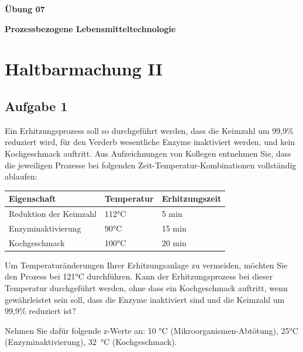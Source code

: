 \documentclass[a4paper,11pt]{article}
\begin{document}


\bckgrnd


\begin{center}
\LARGE
\color{white}
\textbf{Übung 07} \par \vspace*{2mm}
\large \color{miugray} \textbf{Prozessbezogene Lebensmitteltechnologie}
\end{center}
\par 
\vspace*{6mm}


\color{miudiutex}
\section*{Haltbarmachung II}

\subsection*{Aufgabe 1}
Ein Erhitzungsprozess soll so durchgeführt werden, dass die Keimzahl um 99,9\%
reduziert wird, für den Verderb wesentliche Enzyme inaktiviert werden, und kein
Kochgeschmack auftritt. Aus Aufzeichnungen von Kollegen entnehmen Sie, dass die
jeweiligen Prozesse bei folgenden Zeit-Temperatur-Kombinationen vollständig ablaufen:

\begin{center}
\begin{tabular}{|l|l|l|}
\rowcolor{miugray}
Eigenschaft& Temperatur & Erhitzungszeit \\ \hline
Reduktion der Keimzahl & 112°C & 5 min \\ \hline
Enzyminaktivierung & 90°C & 15 min \\ \hline
Kochgeschmack & 100°C & 20 min \\ 
\end{tabular}

\end{center}
Um Temperaturänderungen Ihrer Erhitzungsanlage zu vermeiden, möchten Sie den
Prozess bei 121°C durchführen. Kann der Erhitzungsprozess bei dieser Temperatur
durchgeführt werden, ohne dass ein Kochgeschmack auftritt, wenn gewährleistet sein
soll, dass die Enzyme inaktiviert sind und die Keimzahl um 99,9\% reduziert ist? 
\par 
Nehmen Sie dafür folgende z-Werte an: 10 °C (Mikroorganismen-Abtötung), 25°C
(Enzyminaktivierung), \mbox{32 °C} (Kochgeschmack).
\end{document}
